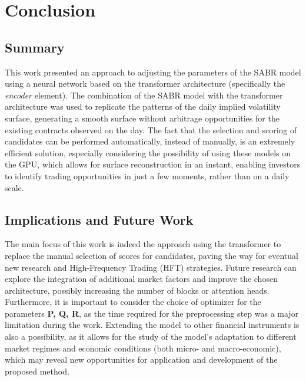 \section{Conclusion}
\subsection{Summary}

This work presented an approach to adjusting the parameters of the SABR model using a neural network based on the transformer architecture (specifically the \textit{encoder} element). The combination of the SABR model with the transformer architecture was used to replicate the patterns of the daily implied volatility surface, generating a smooth surface without arbitrage opportunities for the existing contracts observed on the day. The fact that the selection and scoring of candidates can be performed automatically, instead of manually, is an extremely efficient solution, especially considering the possibility of using these models on the GPU, which allows for surface reconstruction in an instant, enabling investors to identify trading opportunities in just a few moments, rather than on a daily scale.

\subsection{Implications and Future Work}

The main focus of this work is indeed the approach using the transformer to replace the manual selection of scores for candidates, paving the way for eventual new research and High-Frequency Trading (HFT) strategies. Future research can explore the integration of additional market factors and improve the chosen architecture, possibly increasing the number of blocks or attention heads. Furthermore, it is important to consider the choice of optimizer for the parameters \textbf{P, Q, R}, as the time required for the preprocessing step was a major limitation during the work. Extending the model to other financial instruments is also a possibility, as it allows for the study of the model's adaptation to different market regimes and economic conditions (both micro- and macro-economic), which may reveal new opportunities for application and development of the proposed method.
